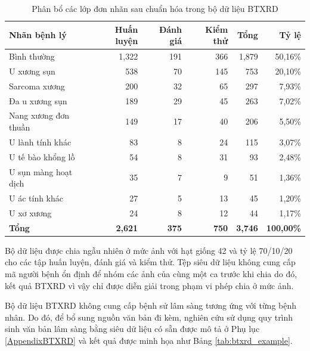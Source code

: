 \begin{table}[htbp]
\centering
\small
\begin{tabular}{|l|r|r|r|r|r|}
\hline
\textbf{Nhãn bệnh lý} & \textbf{Huấn luyện} & \textbf{Đánh giá} & \textbf{Kiểm thử} & \textbf{Tổng} & \textbf{Tỷ lệ} \\ \hline
Bình thường & 1,322 & 191 & 366 & 1,879 & 50,16\% \\ \hline
U xương sụn & 538 & 70 & 145 & 753 & 20,10\% \\ \hline
Sarcoma xương & 200 & 32 & 65 & 297 & 7,93\% \\ \hline
Đa u xương sụn & 189 & 29 & 45 & 263 & 7,02\% \\ \hline
Nang xương đơn thuần & 149 & 17 & 40 & 206 & 5,50\% \\ \hline
U lành tính khác & 83 & 8 & 24 & 115 & 3,07\% \\ \hline
U tế bào khổng lồ & 54 & 8 & 31 & 93 & 2,48\% \\ \hline
U sụn màng hoạt dịch & 35 & 7 & 9 & 51 & 1,36\% \\ \hline
U ác tính khác & 27 & 5 & 13 & 45 & 1,20\% \\ \hline
U xơ xương & 24 & 8 & 12 & 44 & 1,17\% \\ \hline
\textbf{Tổng} & \textbf{2,621} & \textbf{375} & \textbf{750} & \textbf{3,746} & \textbf{100,00\%} \\ \hline
\end{tabular}
\caption{Phân bổ các lớp đơn nhãn sau chuẩn hóa trong bộ dữ liệu BTXRD}
\label{tab:btxrd_pathologies}
\end{table}

\clearpage

Bộ dữ liệu được chia ngẫu nhiên ở mức ảnh với hạt giống 42 và tỷ lệ 70/10/20 cho các tập huấn luyện, đánh giá và kiểm thử. Tệp siêu dữ liệu không cung cấp mã người bệnh ổn định để nhóm các ảnh của cùng một ca trước khi chia do đó, kết quả BTXRD vì vậy chỉ được diễn giải trong phạm vi phép chia ở mức ảnh.

Bộ dữ liệu BTXRD không cung cấp bệnh sử lâm sàng tương ứng với từng bệnh nhân. Do đó, để bổ sung nguồn văn bản đi kèm, nghiên cứu sử dụng quy trình sinh văn bản lâm sàng bằng siêu dữ liệu có sẵn được mô tả ở Phụ lục \ref{AppendixBTXRD} và kết quả được minh họa như Bảng \ref{tab:btxrd_example}.

